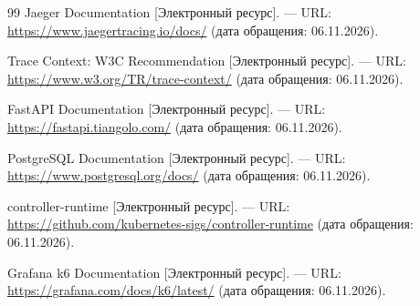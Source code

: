 \begin{thebibliography}{99}
 Jaeger Documentation [Электронный ресурс]. --- URL:
  \url{https://www.jaegertracing.io/docs/} (дата обращения: 06.11.2026).

 Trace Context: W3C Recommendation [Электронный
  ресурс]. --- URL: \url{https://www.w3.org/TR/trace-context/} (дата
  обращения: 06.11.2026).

 FastAPI Documentation [Электронный ресурс]. --- URL:
  \url{https://fastapi.tiangolo.com/} (дата обращения: 06.11.2026).

 PostgreSQL Documentation [Электронный ресурс]. --- URL:
  \url{https://www.postgresql.org/docs/} (дата обращения: 06.11.2026).

 controller-runtime [Электронный ресурс]. ---
  URL: \url{https://github.com/kubernetes-sigs/controller-runtime} (дата
  обращения: 06.11.2026).

 Grafana k6 Documentation [Электронный ресурс]. --- URL:
  \url{https://grafana.com/docs/k6/latest/} (дата обращения: 06.11.2026).

\end{thebibliography}
